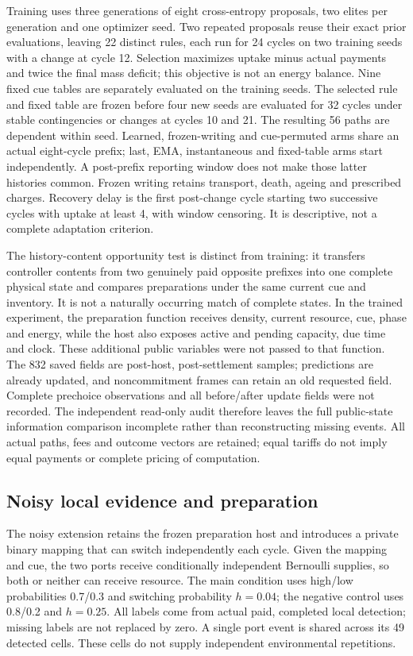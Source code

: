 Training uses three generations of eight cross-entropy proposals, two elites per generation and one optimizer seed. Two repeated proposals reuse their exact prior evaluations, leaving 22 distinct rules, each run for 24 cycles on two training seeds with a change at cycle 12. Selection maximizes uptake minus actual payments and twice the final mass deficit; this objective is not an energy balance. Nine fixed cue tables are separately evaluated on the training seeds. The selected rule and fixed table are frozen before four new seeds are evaluated for 32 cycles under stable contingencies or changes at cycles 10 and 21. The resulting 56 paths are dependent within seed. Learned, frozen-writing and cue-permuted arms share an actual eight-cycle prefix; last, EMA, instantaneous and fixed-table arms start independently. A post-prefix reporting window does not make those latter histories common. Frozen writing retains transport, death, ageing and prescribed charges. Recovery delay is the first post-change cycle starting two successive cycles with uptake at least 4, with window censoring. It is descriptive, not a complete adaptation criterion.

The history-content opportunity test is distinct from training: it transfers controller contents from two genuinely paid opposite prefixes into one complete physical state and compares preparations under the same current cue and inventory. It is not a naturally occurring match of complete states. In the trained experiment, the preparation function receives density, current resource, cue, phase and energy, while the host also exposes active and pending capacity, due time and clock. These additional public variables were not passed to that function. The 832 saved fields are post-host, post-settlement samples; predictions are already updated, and noncommitment frames can retain an old requested field. Complete prechoice observations and all before/after update fields were not recorded. The independent read-only audit therefore leaves the full public-state information comparison incomplete rather than reconstructing missing events. All actual paths, fees and outcome vectors are retained; equal tariffs do not imply equal payments or complete pricing of computation.

\subsection*{Noisy local evidence and preparation}
The noisy extension retains the frozen preparation host and introduces a private binary mapping that can switch independently each cycle. Given the mapping and cue, the two ports receive conditionally independent Bernoulli supplies, so both or neither can receive resource. The main condition uses high/low probabilities 0.7/0.3 and switching probability $h=0.04$; the negative control uses 0.8/0.2 and $h=0.25$. All labels come from actual paid, completed local detection; missing labels are not replaced by zero. A single port event is shared across its 49 detected cells. These cells do not supply independent environmental repetitions.

